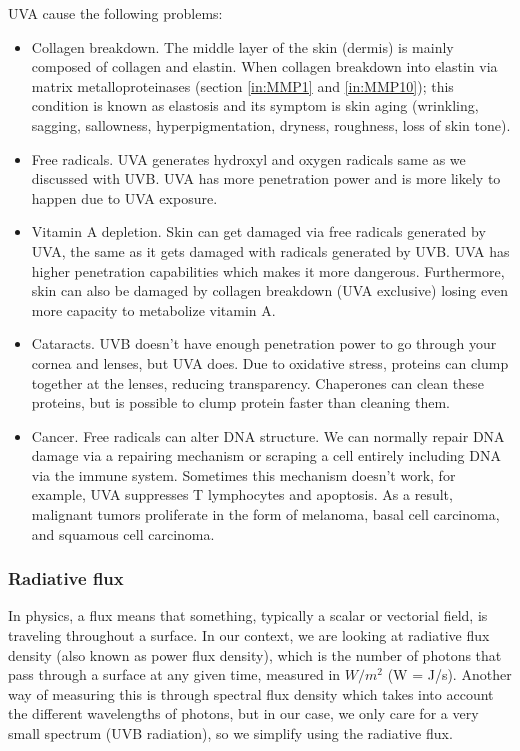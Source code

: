 UVA cause the following problems:

\begin{itemize}

\item Collagen breakdown. The middle layer of the skin (dermis) is mainly composed of collagen and elastin. When collagen breakdown into elastin via matrix metalloproteinases (section \ref{in:MMP1} and \ref{in:MMP10}); this condition is known as elastosis and its symptom is skin aging (wrinkling, sagging, sallowness, hyperpigmentation, dryness, roughness, loss of skin tone).

\item Free radicals. UVA generates hydroxyl and oxygen radicals same as we discussed with UVB. UVA has more penetration power and is more likely to happen due to UVA exposure.

\item Vitamin A depletion. Skin can get damaged via free radicals generated by UVA, the same as it gets damaged with radicals generated by UVB. UVA has higher penetration capabilities which makes it more dangerous. Furthermore, skin can also be damaged by collagen breakdown (UVA exclusive) losing even more capacity to metabolize vitamin A.

\item Cataracts. UVB doesn't have enough penetration power to go through your cornea and lenses, but UVA does. Due to oxidative stress, proteins can clump together at the lenses, reducing transparency. Chaperones can clean these proteins, but is possible to clump protein faster than cleaning them.

\item Cancer. Free radicals can alter DNA structure. We can normally repair DNA damage via a repairing mechanism or scraping a cell entirely including DNA via the immune system. Sometimes this mechanism doesn't work, for example, UVA suppresses T lymphocytes and apoptosis. As a result, malignant tumors proliferate in the form of melanoma, basal cell carcinoma, and squamous cell carcinoma.   

\end{itemize}

\subsubsection{Radiative flux}

In physics, a flux means that something, typically a scalar or vectorial field, is traveling throughout a surface. In our context, we are looking at radiative flux density (also known as power flux density), which is the number of photons that pass through a surface at any given time, measured in $W/m^2$ (W = J/s). Another way of measuring this is through spectral flux density which takes into account the different wavelengths of photons, but in our case, we only care for a very small spectrum (UVB radiation), so we simplify using the radiative flux.

